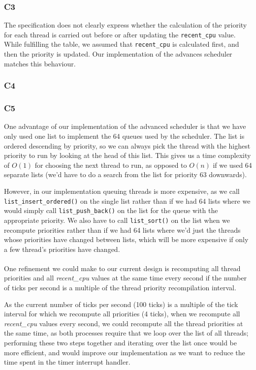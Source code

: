 \documentclass[a4wide, 11pt]{article}
\newcommand{\tx}{\texttt}
\begin{document}
\subsubsection{C3}

The specification does not clearly express whether the calculation of the priority for each thread is carried out before or after updating the \tx{recent\_cpu} value. While fulfilling the table, we assumed that \tx{recent\_cpu} is calculated first, and then the priority is updated. Our implementation of the advances scheduler matches this behaviour.  

\subsubsection{C4}

\subsubsection{C5}

One advantage of our implementation of the advanced scheduler is that we have only used one list to implement the 64 queues used by the scheduler. The list is ordered descending by priority, so we can always pick the thread with the highest priority to run by looking at the head of this list. This gives us a time complexity of $O(1)$ for choosing the next thread to run, as opposed to $O(n)$ if we used 64 separate lists (we'd have to do a search from the list for priority $63$ downwards).

However, in our implementation queuing threads is more expensive, as we call \texttt{list\_insert\_ordered()} on the single list rather than if we had 64 lists where we would simply call \texttt{list\_push\_back()} on the list for the queue with the appropriate priority. We also have to call \texttt{list\_sort()} on the list when we recompute priorities rather than if we had 64 lists where we'd just the threads whose priorities have changed between lists, which will be more expensive if only a few thread's priorities have changed.
\\ \\
One refinement we could make to our current design is recomputing all thread priorities and all \textit{recent\_cpu} values at the same time every second if the number of ticks per second is a multiple of the thread priority recompilation interval.

As the current number of ticks per second (100 ticks) is a multiple of the tick interval for which we recompute all priorities (4 ticks), when we recompute all \textit{recent\_cpu} values every second, we could recompute all the thread priorities at the same time, as both processes require that we loop over the list of all threads; performing these two steps together and iterating over the list once would be more efficient, and would improve our implementation as we want to reduce the time spent in the timer interrupt handler.
\end{document}
